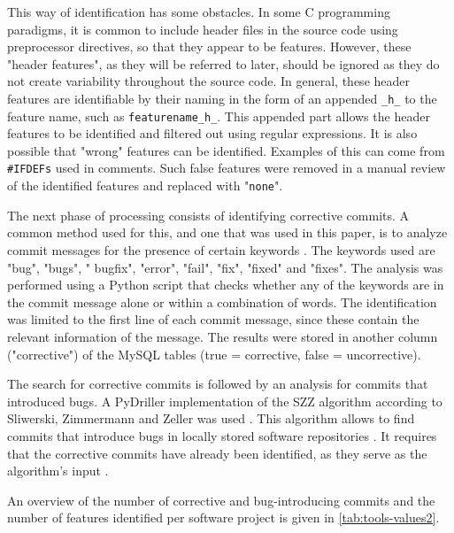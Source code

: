 This way of identification has some obstacles. In some C programming paradigms, it is common to include header files in the source code using preprocessor directives, so that they appear to be features. However, these "header features", as they will be referred to later, should be ignored as they do not create variability throughout the source code. In general, these header features are identifiable by their naming in the form of an appended \texttt{\_h\_} to the feature name, such as \texttt{featurename\_h\_}. This appended part allows the header features to be identified and filtered out using regular expressions. It is also possible that "wrong" features can be identified. Examples of this can come from \texttt{\#IFDEFs} used in comments. Such false features were removed in a manual review of the identified features and replaced with "\texttt{none}".

The next phase of processing consists of identifying corrective commits. A common method used for this, and one that was used in this paper, is to analyze commit messages for the presence of certain keywords \cite{Zimmermann2007}. The keywords used are "bug", "bugs", " bugfix", "error", "fail", "fix", "fixed" and "fixes". The analysis was performed using a Python script that checks whether any of the keywords are in the commit message alone or within a combination of words. The identification was limited to the first line of each commit message, since these contain the relevant information of the message. The results were stored in another column ("corrective") of the MySQL tables (true = corrective, false = uncorrective).

The search for corrective commits is followed by an analysis for commits that introduced bugs. A PyDriller implementation of the SZZ algorithm according to Sliwerski, Zimmermann and Zeller was used \cite{Sliwerski2005,Spadini2018}. This algorithm allows to find commits that introduce bugs in locally stored software repositories \cite{Borg2019}. It requires that the corrective commits have already been identified, as they serve as the algorithm's input \cite{Borg2019}.

An overview of the number of corrective and bug-introducing commits and the number of features identified per software project is given in \autoref{tab:tools-values2}.

